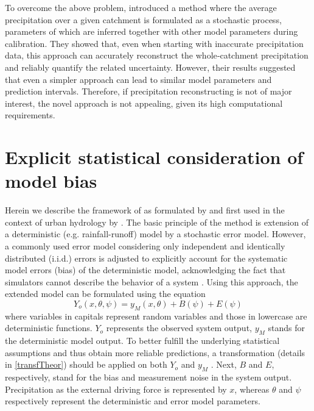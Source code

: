 \documentclass{ctuthesis}\usepackage[]{graphicx}\usepackage[]{color}
\begin{document}
To overcome the above problem, \cite{delgiudiceDescribingCatchmentaveragedPrecipitation2016} introduced a method where the average precipitation over a given catchment is formulated as a stochastic process, parameters of which are inferred together with other model parameters during calibration. They showed that, even when starting with inaccurate precipitation data, this approach can accurately reconstruct the whole‐catchment precipitation and reliably quantify the related uncertainty. However, their results suggested that even a simpler approach \citep[e.g.][]{giudice2013improving} can lead to similar model parameters and prediction intervals. Therefore, if precipitation reconstructing is not of major interest, the novel approach is not appealing, given its high computational requirements.



\section{Explicit statistical consideration of model bias} \label{delGiudTheor}

Herein we describe the framework of \cite{kennedy2001bayesian} as formulated by \cite{reichert2012linking} and first used in the context of urban hydrology by \cite{giudice2013improving}. The basic principle of the method is extension of a deterministic (e.g. rainfall-runoff) model by a stochastic error model. However, a commonly used error model considering only independent and identically distributed (i.i.d.) errors is adjusted to explicitly account for the systematic model errors (bias) of the deterministic model, acknowledging the fact that simulators cannot describe the  behavior of a system \citep{giudice2013improving}. Using this approach, the extended model can be formulated using the equation
\begin{equation} \label{eq:ext_model}
Y_o (x,\theta, \psi) = y_M (x, \theta) + B (\psi) + E (\psi)
\end{equation}
where variables in capitals represent random variables and those in lowercase are deterministic functions. $Y_o$ represents the observed system output, $y_M$ stands for the deterministic model output. To better fulfill the underlying statistical assumptions and thus obtain more reliable predictions, a transformation (details in \ref{transfTheor}) should be applied on both $Y_o$ and $y_M$ \citep{giudice2013improving}. Next, $B$ and $E$, respectively, stand for the bias and  measurement noise in the system output. Precipitation as the external driving force is represented by $x$, whereas $\theta$ and $\psi$ respectively represent the deterministic and error model parameters.  
\end{document}

